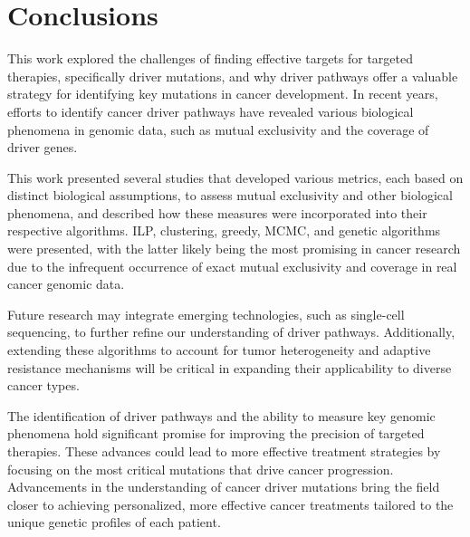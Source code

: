 \chapter*{Conclusions}


This work explored the challenges of finding effective targets for targeted therapies, specifically driver mutations, and why driver pathways offer a valuable strategy for identifying key mutations in cancer development. In recent years, efforts to identify cancer driver pathways have revealed various biological phenomena in genomic data, such as mutual exclusivity and the coverage of driver genes.

This work presented several studies that developed various metrics, each based on distinct biological assumptions, to assess mutual exclusivity and other biological phenomena, and described how these measures were incorporated into their respective algorithms. ILP, clustering, greedy, MCMC, and genetic algorithms were presented, with the latter likely being the most promising in cancer research due to the infrequent occurrence of exact mutual exclusivity and coverage in real cancer genomic data.

Future research may integrate emerging technologies, such as single-cell sequencing, to further refine our understanding of driver pathways. Additionally, extending these algorithms to account for tumor heterogeneity and adaptive resistance mechanisms will be critical in expanding their applicability to diverse cancer types.

The identification of driver pathways and the ability to measure key genomic phenomena hold significant promise for improving the precision of targeted therapies. These advances could lead to more effective treatment strategies by focusing on the most critical mutations that drive cancer progression. Advancements in the understanding of cancer driver mutations bring the field closer to achieving personalized, more effective cancer treatments tailored to the unique genetic profiles of each patient.
